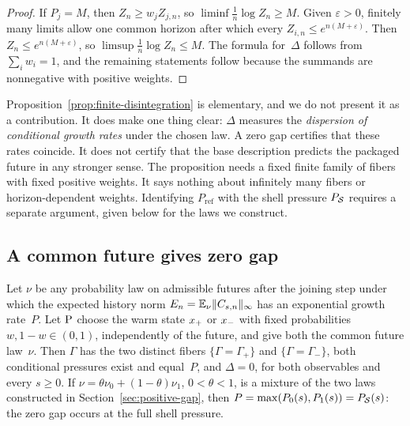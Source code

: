 \begin{proof}
If $P_j=M$, then $Z_n\ge w_jZ_{j,n}$, so $\liminf\frac1n\log Z_n\ge M$. Given $\varepsilon>0$, finitely many limits allow one common horizon after which every $Z_{i,n}\le e^{n(M+\varepsilon)}$. Then $Z_n\le e^{n(M+\varepsilon)}$, so $\limsup\frac1n\log Z_n\le M$. The formula for~$\Delta$ follows from $\sum_iw_i=1$, and the remaining statements follow because the summands are nonnegative with positive weights.
\end{proof}

Proposition~\ref{prop:finite-disintegration} is elementary, and we do not present it as a contribution. It does make one thing clear: $\Delta$ measures the \emph{dispersion of conditional growth rates} under the chosen law. A zero gap certifies that these rates coincide. It does not certify that the base description predicts the packaged future in any stronger sense. The proposition needs a fixed finite family of fibers with fixed positive weights. It says nothing about infinitely many fibers or horizon-dependent weights. Identifying $P_{\mathrm{ref}}$ with the shell pressure $P_{\mathcal{S}}$ requires a separate argument, given below for the laws we construct.

\subsection{A common future gives zero gap}\label{sec:zero-gap}

\begin{proposition}\label{prop:zero-gap}
Let $\nu$ be any probability law on admissible futures after the joining step under which the expected history norm $E_n=\mathbb{E}_\nu\lVert C_{s,n}\rVert_{\infty}$ has an exponential growth rate~$P$. Let $\mathrm{P}$ choose the warm state $x_{+}$ or $x_{-}$ with fixed probabilities $w,1-w\in(0,1)$, independently of the future, and give both the common future law~$\nu$. Then $\Gamma$ has the two distinct fibers $\{\Gamma=\Gamma_+\}$ and $\{\Gamma=\Gamma_-\}$, both conditional pressures exist and equal~$P$, and $\Delta=0$, for both observables and every $s\ge0$. If $\nu=\theta\nu_0+(1-\theta)\nu_1$, $0<\theta<1$, is a mixture of the two laws constructed in Section~\ref{sec:positive-gap}, then $P=\max(P_0(s),P_1(s))=P_{\mathcal{S}}(s)$: the zero gap occurs at the full shell pressure.
\end{proposition}

